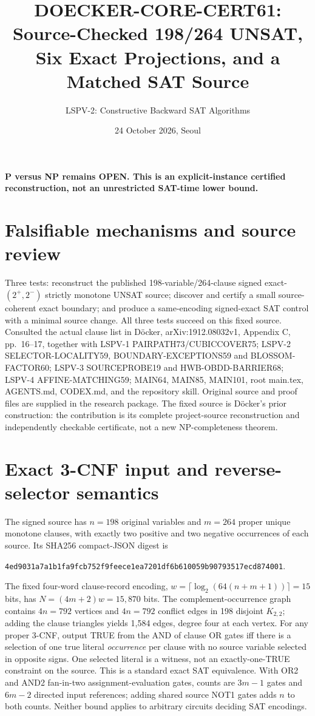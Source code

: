 \documentclass[11pt]{article}
\title{DOECKER-CORE-CERT61: Source-Checked 198/264 UNSAT, Six Exact Projections, and a Matched SAT Source}
\author{LSPV-2: Constructive Backward SAT Algorithms}
\date{24 October 2026, Seoul}
\begin{document}
\maketitle
\begin{center}\textbf{P versus NP remains OPEN. This is an explicit-instance certified reconstruction, not an unrestricted SAT-time lower bound.}\end{center}
\section{Falsifiable mechanisms and source review}
Three tests: reconstruct the published 198-variable/264-clause signed exact-$(2^+,2^-)$ strictly monotone UNSAT source; discover and certify a small source-coherent exact boundary; and produce a same-encoding signed-exact SAT control with a minimal source change. All three tests succeed on this fixed source. Consulted the actual clause list in D\"ocker, arXiv:1912.08032v1, Appendix C, pp.~16--17, together with LSPV-1 PAIRPATH73/CUBICCOVER75; LSPV-2 SELECTOR-LOCALITY59, BOUNDARY-EXCEPTIONS59 and BLOSSOM-FACTOR60; LSPV-3 SOURCEPROBE19 and HWB-OBDD-BARRIER68; LSPV-4 AFFINE-MATCHING59; MAIN64, MAIN85, MAIN101, root main.tex, AGENTS.md, CODEX.md, and the repository skill. Original source and proof files are supplied in the research package. The fixed source is D\"ocker's prior construction: the contribution is its complete project-source reconstruction and independently checkable certificate, not a new NP-completeness theorem.

\section{Exact 3-CNF input and reverse-selector semantics}
The signed source has $n=198$ original variables and $m=264$ proper unique monotone clauses, with exactly two positive and two negative occurrences of each source. Its SHA256 compact-JSON digest is
{\small\begin{center}\texttt{4ed9031a7a1b1fa9fcb752f9feece1ea7201df6b610059b90793517ecd874001}.\end{center}}
The fixed four-word clause-record encoding, $w=\lceil\log_2(64(n+m+1))\rceil=15$ bits, has $N=(4m+2)w=15,870$ bits. The complement-occurrence graph contains $4n=792$ vertices and $4n=792$ conflict edges in 198 disjoint $K_{2,2}$; adding the clause triangles yields 1,584 edges, degree four at each vertex. For any proper 3-CNF, output TRUE from the AND of clause OR gates iff there is a selection of one true literal \emph{occurrence} per clause with no source variable selected in opposite signs. One selected literal is a witness, not an exactly-one-TRUE constraint on the source. This is a standard exact SAT equivalence. With OR2 and AND2 fan-in-two assignment-evaluation gates, counts are $3m-1$ gates and $6m-2$ directed input references; adding shared source NOT1 gates adds $n$ to both counts. Neither bound applies to arbitrary circuits deciding SAT encodings.
\end{document}
